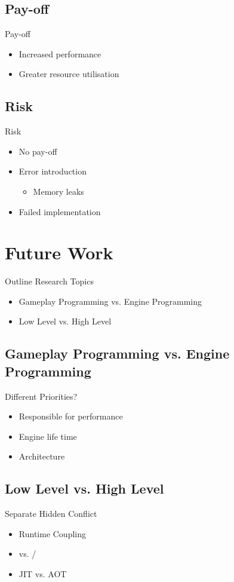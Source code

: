 \subsection{Pay-off}
\begin{frame}{\secname}{\subsecname}
	Pay-off
	\begin{itemize}
		\item<2-> Increased performance
		\item<3-> Greater resource utilisation
	\end{itemize}
\end{frame}

\subsection{Risk}
\begin{frame}{\secname}{\subsecname}
	Risk
	\begin{itemize}
		\item<2-> No pay-off
		\item<3-> Error introduction
		\begin{itemize}
			\item<4-> Memory leaks
		\end{itemize}
		\item<5-> Failed implementation
	\end{itemize}
\end{frame}

\section{Future Work}
\begin{frame}{\secname}{Outline}
	Research Topics
	\begin{itemize}
		\item Gameplay Programming vs. Engine Programming
		\item Low Level vs. High Level
	\end{itemize}
\end{frame}

\subsection{Gameplay Programming vs. Engine Programming}
\begin{frame}{\secname}{\subsecname}
	Different Priorities?
	\begin{itemize}
		\item<2-> Responsible for performance
		\item<3-> Engine life time
		\item<4-> Architecture
	\end{itemize}
\end{frame}

\subsection{Low Level vs. High Level}
\begin{frame}{\secname}{\subsecname}
	Separate Hidden Conflict
	\begin{itemize}
		\item<2-> Runtime Coupling
		\item<3-> \cpp vs. \cs/\fs
		\item<4-> JIT vs. AOT
	\end{itemize}
\end{frame}
